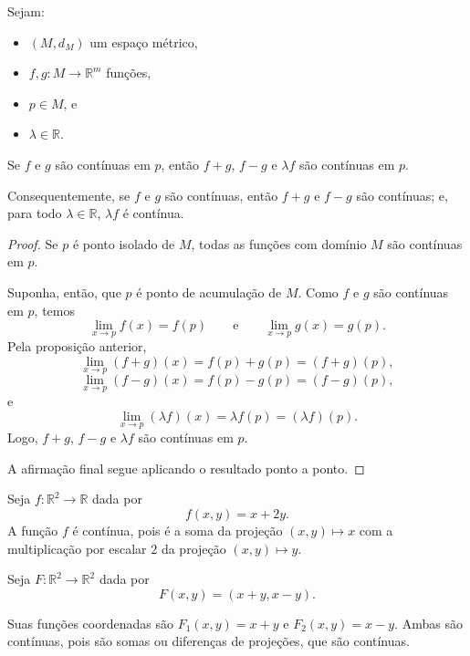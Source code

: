 \begin{corollary}
    Sejam:
    \begin{itemize}
        \item $(M,d_M)$ um espaço métrico,
        \item $f,g:M\to\mathbb R^m$ funções,
        \item $p\in M$, e
        \item $\lambda\in\mathbb R$.
    \end{itemize}

    Se $f$ e $g$ são contínuas em $p$, então $f+g$, $f-g$ e $\lambda f$ são contínuas em $p$.

    Consequentemente, se $f$ e $g$ são contínuas, então $f+g$ e $f-g$ são contínuas; e, para todo $\lambda\in\mathbb R$, $\lambda f$ é contínua.
\end{corollary}

\begin{proof}
    Se $p$ é ponto isolado de $M$, todas as funções com domínio $M$ são contínuas em $p$.

    Suponha, então, que $p$ é ponto de acumulação de $M$.
    Como $f$ e $g$ são contínuas em $p$, temos
    \[
        \lim_{x\to p} f(x)=f(p)
        \qquad\text{e}\qquad
        \lim_{x\to p} g(x)=g(p).
    \]
    Pela proposição anterior,
    \[
        \lim_{x\to p}(f+g)(x)=f(p)+g(p)=(f+g)(p),
    \]
    \[
        \lim_{x\to p}(f-g)(x)=f(p)-g(p)=(f-g)(p),
    \]
    e
    \[
        \lim_{x\to p}(\lambda f)(x)=\lambda f(p)=(\lambda f)(p).
    \]
    Logo, $f+g$, $f-g$ e $\lambda f$ são contínuas em $p$.

    A afirmação final segue aplicando o resultado ponto a ponto.
\end{proof}

\begin{example}
    Seja $f:\mathbb R^2\to\mathbb R$ dada por
    \[
        f(x,y)=x+2y.
    \]
    A função $f$ é contínua, pois é a soma da projeção $(x,y)\mapsto x$ com a multiplicação por escalar $2$ da projeção $(x,y)\mapsto y$.
\end{example}

\begin{example}
    Seja $F:\mathbb R^2\to\mathbb R^2$ dada por
    \[
        F(x,y)=(x+y,x-y).
    \]

    Suas funções coordenadas são $F_1(x,y)=x+y$ e $F_2(x,y)=x-y$.
    Ambas são contínuas, pois são somas ou diferenças de projeções, que são contínuas.    
\end{example}

